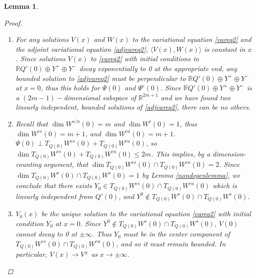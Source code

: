 \documentclass[12pt]{article}
\def\R{{\mathbb R}}
\newtheorem{lemma}{Lemma}
\begin{document}
\begin{lemma}
\begin{proof}
\begin{enumerate}
\[
\Psi^c(x) = \begin{pmatrix}
-c_0 + g_1(x) \\ g_2(x) \\
-c_2 + g_3(x) \\ g_4(x) \\
\vdots \\
-c_{2m-2} + g_{2m-1}(x) \\ g_{2m}(x) \\ 1
\end{pmatrix}
\]

where the functions $g_j(x)$ are linear combinations of the functions $f_j(x)$ from \eqref{DefA} and their derivatives and are thus exponentially localized. It follows that $\Psi^c(x) \rightarrow W_0$ as $|x| \rightarrow \infty$, where $W_0$ is given by \eqref{W0}.

\item For any solutions $V(x)$ and $W(x)$ to the variational equation \eqref{vareq2} and the adjoint variational equation \eqref{adjvareq2}, $\langle V(x), W(x) \rangle$ is constant in $x$. Since solutions $V(x)$ to \eqref{vareq2} with initial conditions in $\R Q'(0) \oplus Y^+ \oplus Y^-$ decay exponentially to 0 at the appropriate end, any bounded solution to \eqref{adjvareq2} must be perpendicular to $\R Q'(0) \oplus Y^+ \oplus Y^-$ at $x = 0$, thus this holds for $\Psi(0)$ and $\Psi^c(0)$. Since $\R Q'(0) \oplus Y^+ \oplus Y^-$ is a $(2m-1)-$dimensional subspace of $\R^{2m+1}$ and we have found two linearly independent, bounded solutions of \eqref{adjvareq2}, there can be no others.

\item Recall that $\dim W^{s/u}(0) = m$ and $\dim W^c(0) = 1$, thus $\dim W^{cs}(0) = m + 1$, and $\dim W^{cu}(0) = m + 1$. $\Psi(0) \perp T_{Q(0)}W^{cs}(0) + T_{Q(0)}W^{cu}(0)$, so $\dim T_{Q(0)}W^{cs}(0) + T_{Q(0)}W^{cu}(0) \leq 2m$. This implies, by a dimension-counting argument, that $\dim T_{Q(0)}W^{cs}(0) \cap T_{Q(0)}W^{cu}(0) = 2$. Since $\dim T_{Q(0)}W^s(0) \cap T_{Q(0)}W^s(0) = 1$ by Lemma \ref{nondegenlemma}, we conclude that there exists $Y_0 \in T_{Q(0)}W^{cs}(0) \cap T_{Q(0)}W^{cu}(0)$ which is linearly independent from $Q'(0)$, and $Y^0 \notin T_{Q(0)}W^s(0) \cap T_{Q(0)}W^s(0)$.

\item $V_0(x)$ be the unique solution to the variational equation \eqref{vareq2} with initial condition $Y_0$ at $x = 0$. Since $Y^0 \notin T_{Q(0)}W^s(0) \cap T_{Q(0)}W^s(0)$, $V(0)$ cannot decay to 0 at $\pm \infty$. Thus $Y_0$ must be in the center component of $T_{Q(0)}W^{cs}(0) \cap T_{Q(0)}W^{cu}(0)$, and so it must remain bounded. In particular, $V(x) \rightarrow V^\pm$ as $x \rightarrow \pm \infty$.


\end{enumerate}
\end{proof}
\end{lemma}
\end{document}
